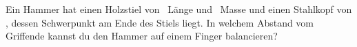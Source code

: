 Ein Hammer hat einen Holzstiel von \LSO\ Länge und \mHO\ Masse und einen Stahlkopf von \mKO, dessen Schwerpunkt am Ende des Stiels liegt. In welchem Abstand vom Griffende kannst du den Hammer auf einem Finger balancieren?
